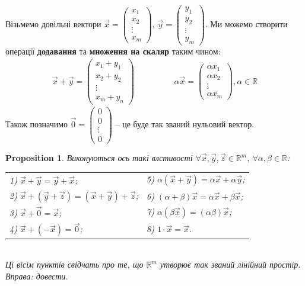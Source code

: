 \documentclass[a4paper, 10pt]{article}
\theoremstyle{theoremdd}
\theoremstyle{theoremdd}
\theoremstyle{theoremdd}
\theoremstyle{theoremdd}
\theoremstyle{theoremdd}
\theoremstyle{theoremdd}
\newtheorem{proposition}[theorem]{Proposition}
\theoremstyle{theoremdd}
\theoremstyle{theoremdd}
\theoremstyle{theoremdd}
\begin{document}
Візьмемо довільні вектори $\vec{x} = \begin{pmatrix}
x_1 \\ x_2 \\ \vdots \\ x_m
\end{pmatrix}$, $\vec{y} = \begin{pmatrix}
y_1 \\ y_2 \\ \vdots \\ y_m
\end{pmatrix}$. Ми можемо створити операції \textbf{додавання} та \textbf{множення на скаляр} таким чином:
\begin{align*}
\vec{x} + \vec{y} = \begin{pmatrix}
x_1 + y_1 \\ x_2 + y_2 \\ \vdots \\ x_m + y_n
\end{pmatrix} \hspace{2cm} \alpha \vec{x} = \begin{pmatrix}
\alpha x_1 \\ \alpha x_2 \\ \vdots \\ \alpha x_m
\end{pmatrix}, \alpha \in \mathbb{R}
\end{align*}
Також позначимо $\vec{0} = \begin{pmatrix}
0 \\ 0 \\ \vdots \\ 0
\end{pmatrix}$ -- це буде так званий нульовий вектор.
\begin{proposition}
Виконуються ось такі влстивості $\forall \vec{x},\vec{y},\vec{z} \in \mathbb{R}^m,\ \forall \alpha,\beta \in \mathbb{R}$:\\
\begin{tabular}{ll}
1) $\vec{x} + \vec{y} = \vec{y} + \vec{x}$; & 5) $\alpha (\vec{x} + \vec{y}) = \alpha \vec{x} + \alpha \vec{y}$; \\
2) $\vec{x} + (\vec{y} + \vec{z}) = (\vec{x} + \vec{y}) + \vec{z}$; & 6) $(\alpha + \beta) \vec{x} = \alpha \vec{x} + \beta \vec{x}$; \\
3) $\vec{x} + \vec{0} = \vec{x}$; & 7) $\alpha (\beta \vec{x}) = (\alpha \beta) \vec{x}$; \\
4) $\vec{x} + (-\vec{x}) = \vec{0}$; & 8) $1 \cdot \vec{x} = \vec{x}$.
\end{tabular}\\
Ці вісім пунктів свідчать про те, що $\mathbb{R}^m$ утворює так званий лінійний простір.\\
\textit{Вправа: довести.}
\end{proposition}
\end{document}
